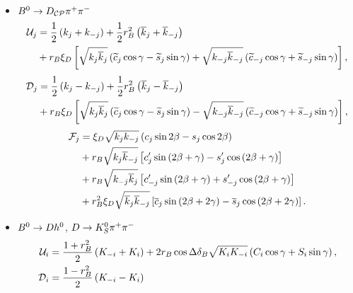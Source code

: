 \documentclass[a4paper,11pt]{article}
\begin{document}
\begin{itemize}
 \item $B^0\to D_{\mathcal{CP}}\pi^+\pi^-$
 \begin{equation}\label{eq:u_bdpp_dcp_scs}
  \begin{split}
   \mathcal{U}_{j} &= \frac{1}{2}\left( k_j + k_{-j} \right) + \frac{1}{2}r_{B}^2\left(\overline{k}_j + \overline{k}_{-j}\right)\\
              &+ r_{B}\xi_D\left[\sqrt{k_j\overline{k}_j}\left( \widetilde{c}_j\cos{\gamma} - \widetilde{s}_j\sin{\gamma} \right) 
              +  \sqrt{k_{-j}\overline{k}_{-j}}\left( \widetilde{c}_{-j}\cos{\gamma} + \widetilde{s}_{-j}\sin{\gamma} \right) \right],
  \end{split}
 \end{equation}
 \begin{equation}\label{eq:c_bdpp_dcp_scs}
  \begin{split}
   \mathcal{D}_{j} &= \frac{1}{2}\left( k_j - k_{-j}\right) + \frac{1}{2}r_{B}^2\left(\overline{k}_j - \overline{k}_{-j}\right) \\
              &+ r_{B}\xi_D\left[\sqrt{k_j\overline{k}_j}\left( \widetilde{c}_j\cos{\gamma} - \widetilde{s}_j\sin{\gamma} \right) 
              -  \sqrt{k_{-j}\overline{k}_{-j}}\left( \widetilde{c}_{-j}\cos{\gamma} + \widetilde{s}_{-j}\sin{\gamma} \right) \right],
  \end{split}
 \end{equation}
 \begin{equation}\label{eq:s_bdpp_dcp_scs}
  \begin{split}
   \mathcal{F}_{j}
   &=\xi_D\sqrt{k_jk_{-j}}\left( c_j\sin{2\beta} - s_j\cos{2\beta} \right) \\
   &+r_{B}\sqrt{k_j\overline{k}_{-j}}\left[c^{\prime}_j\sin{\left(2\beta+ \gamma\right)} -
                              s^{\prime}_j\cos{\left(2\beta+ \gamma\right)}\right]\\
   &+r_{B}\sqrt{k_{-j}\overline{k}_j}\left[c^{\prime}_{-j}\sin{\left(2\beta+\gamma\right)} +
                              s^{\prime}_{-j}\cos{\left(2\beta+\gamma\right)}\right]\\
   &+r_{B}^2\xi_D\sqrt{\overline{k}_j\overline{k}_{-j}}\left[ \overline{c}_j\sin{\left(2\beta+ 2\gamma\right)} -
                                       \overline{s}_j\cos{\left(2\beta+ 2\gamma\right)} \right].
  \end{split}
 \end{equation}
 \item $B^0\to D h^0$, $D\to K_S^0\pi^+\pi^-$
 \begin{subequations}\label{eq:ud_bdh_dkpp_scs}
  \begin{align}
   \label{eq:u_bdh_dkpp_scs}
   \ucoef_{i} &= \frac{1 + \rbd^2}{2}\lbr \kmi + \ki \rbr
   + 2\rbd\cos{\dbd}\sqrt{\ki\kmi}\lbr \ci\cos{\gphi} + \si\sin{\gphi} \rbr, \\ 
   \label{eq:c_bdh_dkpp_scs}
   \ccoef_{i} &= \frac{1 - \rbd^2}{2}\lbr \kmi - \ki \rbr

\end{align}
\end{subequations}
\end{itemize}
\end{document}
